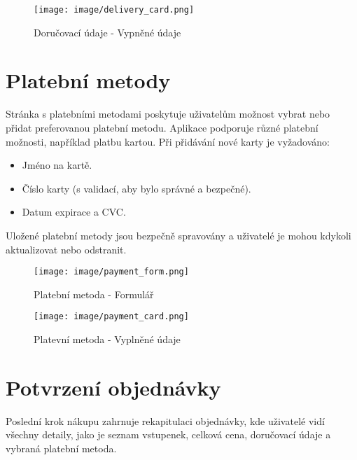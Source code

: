 \documentclass[12pt, a4paper,
twoside,        %
openright
]{report}
\begin{document}
	\begin{figure}[h!]
		\centering %
		\texttt{[image: image/delivery\_card.png]} %
		\caption{Doručovací údaje - Vypněné údaje} %
		\label{fig:deliverycard} %
	\end{figure}
	
	\clearpage
	
	\section{Platební metody}
	Stránka s platebními metodami poskytuje uživatelům možnost vybrat nebo přidat preferovanou platební metodu. Aplikace podporuje různé platební možnosti, například platbu kartou. \linebreak Při přidávání nové karty je vyžadováno:
	
	\begin{itemize}
		\item Jméno na kartě.
		\item Číslo karty (s validací, aby bylo správné a bezpečné).
		\item Datum expirace a CVC.
	\end{itemize}
	
	Uložené platební metody jsou bezpečně spravovány a uživatelé je mohou kdykoli aktualizovat nebo odstranit.
	
	\clearpage
	
	\begin{figure}[h!]
		\centering %
		\texttt{[image: image/payment\_form.png]} %
		\caption{Platební metoda - Formulář} %
		\label{fig:paymentform} %
	\end{figure}
	
	\begin{figure}[h!]
		\centering %
		\texttt{[image: image/payment\_card.png]} %
		\caption{Platevní metoda - Vyplněné údaje} %
		\label{fig:paymentcard} %
	\end{figure}
	
	\clearpage
	
	\section{Potvrzení objednávky}
	Poslední krok nákupu zahrnuje rekapitulaci objednávky, kde uživatelé vidí všechny detaily, jako je seznam vstupenek, celková cena, doručovací údaje a vybraná platební metoda. 
	
\end{document}
